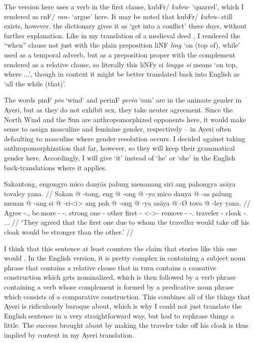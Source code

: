 \documentclass[12pt,paper=a4]{scrartcl}
\newcommand{\ayr}[1]{{\Tagati #1}}
\newcommand{\xayr}[3]{{\Tagati #1} \emph{#2} \enquote*{#3}}
\begin{document}
The \citeyear{becker2004} version here uses a verb in the first clause, \xayr{kubFr/}{kubra-}{quarrel}, which I rendered as \xayr{rnF/}{ran-}{argue} here. It may be noted that \ayr{kubFr/} \textit{kubra-} still exists, however, the dictionary gives it as `get into a conflict' these days, without further explanation. Like in my translation of a medieval deed \autocite[9]{becker2015}, I rendered the \enquote{when} clause not just with the plain preposition \xayr{liNF}{ling}{on (top of), while} used as a temporal adverb, but as a preposition proper with the complement rendered as a relative clause, so literally this \ayr{liNFy si} \textit{lingya si} means `on top, where ...', though in context it might be better translated back into English as `all the while (that)'.

The words \xayr{pinF}{pin}{wind} and \xayr{perinF}{perin}{sun} are in the animate gender in Ayeri, but as they do not exhibit sex, they take neuter agreement. Since the North Wind and the Sun are anthropomorphized opponents here, it would make sense to assign masculine and feminine gender, respectively -- in Ayeri often defaulting to masculine where gender resolution occurs. I decided against taking anthropomorphization that far, however, so they will keep their grammatical gender here. Accordingly, I will give `it' instead of `he' or `she' in the English back-translations where it applies.

\ex %
\begingl
	\glpreamble Sakantong, engongyo mico danyās palung menanang sirī ang pahongya asāya tovaley yana. //
	\gla Sakan @ -tong, eng @ -ong @ -yo mico danya @ -as palung menan @ -ang si @ -ri<i> ang pah @ -ong @ -ya asāya @ -Ø tova @ -ley yana. //
	\glb Agree -\Tpl{}.\N{}, be.more -\Irr{} -\Tsg{}.\N{} strong one -\Parg{} other first -\Aarg{} \Rel{} <-\Aarg{}>-\Ins{} \AgtT{} remove -\Irr{} -\Tsg{}.\M{} traveler -\Top{} cloak -\Parg{}.\Inan{} \Tsg{}.\M{}.\Gen{}. //
	\glft `They agreed that the first one due to whom the traveller would take off his cloak would be stronger than the other.' //
\endgl
\xe

I think that this sentence at least counters the claim that stories like this one would . In the English version, it is pretty complex in containing a subject noun phrase that contains a relative clause that in turn contains a causative construction which gets nominalized, which is then followed by a verb phrase containing a verb whose complement is formed by a predicative noun phrase which consists of a comparative construction. This combines all of the things that Ayeri is ridiculously baroque about, which is why I could not just translate the English sentence in a very straightforward way, but had to rephrase things a little. The success brought about by making the traveler take off his cloak is thus implied by context in my Ayeri translation.
\end{document}
